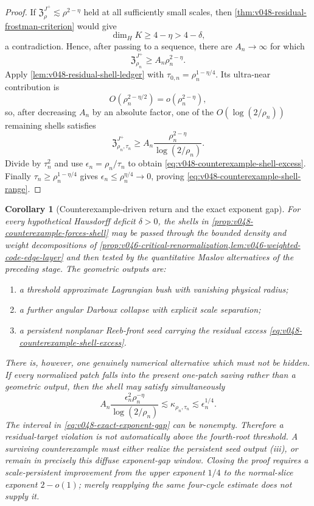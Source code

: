 \documentclass[10pt]{article}
\newtheorem{corollary}[theorem]{Corollary}
\begin{document}
\begin{proof}
If \(\mathfrak Z_\rho^{J^+}\lesssim\rho^{2-\eta}\) held at all sufficiently small scales, then
\cref{thm:v048-residual-frostman-criterion} would give
\[
\dim_HK\ge4-\eta>4-\delta,
\]
a contradiction.  Hence, after passing to a sequence, there are \(A_n\to\infty\) for which
\[
\mathfrak Z_{\rho_n}^{J^+}
\ge
A_n\rho_n^{2-\eta}.
\]
Apply \cref{lem:v048-residual-shell-ledger} with
\(\tau_{0,n}=\rho_n^{1-\eta/4}\).  Its ultra-near contribution is
\[
O(\rho_n^{2-\eta/2})
=
o(\rho_n^{2-\eta}),
\]
so, after decreasing \(A_n\) by an absolute factor, one of the
\(O(\log(2/\rho_n))\) remaining shells satisfies
\[
\mathfrak Z_{\rho_n,\tau_n}^{J^+}
\ge
A_n\frac{\rho_n^{2-\eta}}{\log(2/\rho_n)}.
\]
Divide by \(\tau_n^2\) and use
\(\epsilon_n=\rho_n/\tau_n\) to obtain
\eqref{eq:v048-counterexample-shell-excess}.  Finally
\(\tau_n\ge\rho_n^{1-\eta/4}\) gives
\(\epsilon_n\le\rho_n^{\eta/4}\to0\), proving
\eqref{eq:v048-counterexample-shell-range}.
\end{proof}

\begin{corollary}[Counterexample-driven return and the exact exponent gap]
\label{cor:v048-counterexample-trichotomy}
For every hypothetical Hausdorff deficit \(\delta>0\), the shells in
\cref{prop:v048-counterexample-forces-shell} may be passed through the bounded density and weight
decompositions of
\cref{prop:v046-critical-renormalization,lem:v046-weighted-code-edge-layer} and then tested by the
quantitative Maslov alternatives of the preceding stage.  The geometric outputs are:
\begin{enumerate}[label=\textnormal{(\roman*)}]
\item a threshold approximate Lagrangian bush with vanishing physical radius;
\item a further angular Darboux collapse with explicit scale separation;
\item a persistent nonplanar Reeb-front seed carrying the residual excess
\eqref{eq:v048-counterexample-shell-excess}.
\end{enumerate}
There is, however, one genuinely numerical alternative which must not be hidden.  If every normalized
patch falls into the present one-patch saving rather than a geometric output, then the shell may
satisfy simultaneously
\begin{equation}
\label{eq:v048-exact-exponent-gap}
\boxed{
A_n\frac{\epsilon_n^2\rho_n^{-\eta}}{\log(2/\rho_n)}
\lesssim
\kappa_{\rho_n,\tau_n}
\lesssim
\epsilon_n^{1/4}.
}
\end{equation}
The interval in \eqref{eq:v048-exact-exponent-gap} can be nonempty.  Therefore a residual-target
violation is not automatically above the fourth-root threshold.  A surviving counterexample must
either realize the persistent seed output (iii), or remain in precisely this diffuse exponent-gap
window.  Closing the proof requires a scale-persistent improvement from the upper exponent
\(1/4\) to the normal-slice exponent \(2-o(1)\); merely reapplying the same four-cycle estimate does
not supply it.
\end{corollary}
\end{document}
